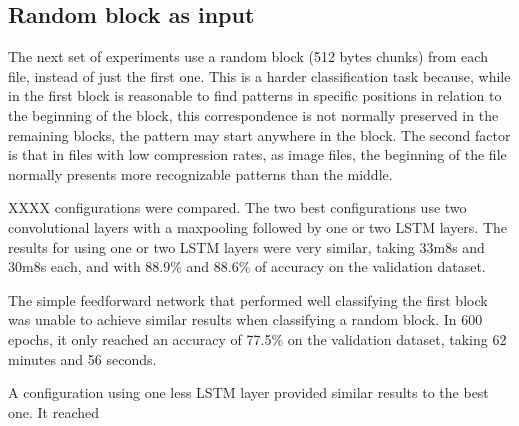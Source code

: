 



\subsection{Random block as input}

The next set of experiments use a random block (512 bytes chunks) from each file, instead of just the first one. This is a harder classification task because, while in the first block is reasonable to find patterns in specific positions in relation to the beginning of the block, this correspondence is not normally preserved in the remaining blocks, the pattern may start anywhere in the block. The second factor is that in files with low compression rates, as image files, the beginning of the file normally presents more recognizable patterns than the middle.


XXXX configurations were compared.
The two best configurations use two convolutional layers with a maxpooling followed by one or two LSTM layers. The results for using one or two LSTM layers were very similar, taking 33m8s and 30m8s each, and with 88.9\% and 88.6\% of accuracy on the validation dataset. 

The simple feedforward network that performed well classifying the first block was unable to achieve similar results when classifying a random block. In 600 epochs, it only reached an accuracy of 77.5\% on the validation dataset, taking 62 minutes and 56 seconds.

A configuration using one less LSTM layer provided similar results to the best one. It reached 


